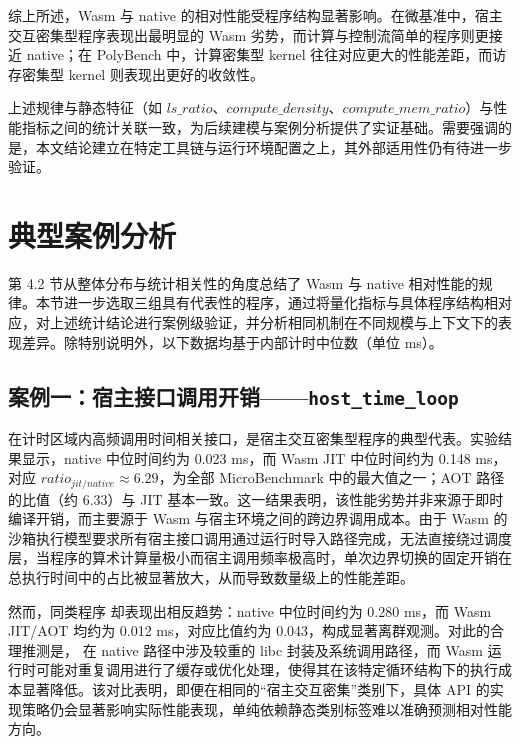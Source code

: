 综上所述，Wasm 与 native 的相对性能受程序结构显著影响。在微基准中，宿主交互密集型程序表现出最明显的 Wasm 劣势，而计算与控制流简单的程序则更接近 native；在 PolyBench 中，计算密集型 kernel 往往对应更大的性能差距，而访存密集型 kernel 则表现出更好的收敛性。

上述规律与静态特征（如 $ls\_ratio$、$compute\_density$、$compute\_mem\_ratio$）与性能指标之间的统计关联一致，为后续建模与案例分析提供了实证基础。需要强调的是，本文结论建立在特定工具链与运行环境配置之上，其外部适用性仍有待进一步验证。





\section{典型案例分析}

第 4.2 节从整体分布与统计相关性的角度总结了 Wasm 与 native 相对性能的规律。本节进一步选取三组具有代表性的程序，通过将量化指标与具体程序结构相对应，对上述统计结论进行案例级验证，并分析相同机制在不同规模与上下文下的表现差异。除特别说明外，以下数据均基于内部计时中位数（单位 ms）。

\subsection{案例一：宿主接口调用开销——\texttt{host\_time\_loop}}

 在计时区域内高频调用时间相关接口，是宿主交互密集型程序的典型代表。实验结果显示，native 中位时间约为 0.023 ms，而 Wasm JIT 中位时间约为 0.148 ms，对应 $ratio_{jit/native} \approx 6.29$，为全部 MicroBenchmark 中的最大值之一；AOT 路径的比值（约 6.33）与 JIT 基本一致。这一结果表明，该性能劣势并非来源于即时编译开销，而主要源于 Wasm 与宿主环境之间的跨边界调用成本。由于 Wasm 的沙箱执行模型要求所有宿主接口调用通过运行时导入路径完成，无法直接绕过调度层，当程序的算术计算量极小而宿主调用频率极高时，单次边界切换的固定开销在总执行时间中的占比被显著放大，从而导致数量级上的性能差距。

然而，同类程序  却表现出相反趋势：native 中位时间约为 0.280 ms，而 Wasm JIT/AOT 均约为 0.012 ms，对应比值约为 0.043，构成显著离群观测。对此的合理推测是， 在 native 路径中涉及较重的 libc 封装及系统调用路径，而 Wasm 运行时可能对重复调用进行了缓存或优化处理，使得其在该特定循环结构下的执行成本显著降低。该对比表明，即便在相同的“宿主交互密集”类别下，具体 API 的实现策略仍会显著影响实际性能表现，单纯依赖静态类别标签难以准确预测相对性能方向。

